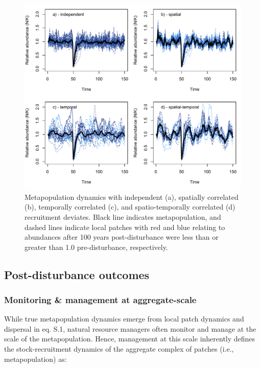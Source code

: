 \documentclass[
]{article}
\begin{document}
\begin{figure}[H]

{\centering \includegraphics{Managing_for_ecological_surprises_in_metapopulations_files/figure-latex/independent stochasticity-1} 

}

\caption{Metapopulation dynamics with independent (a), spatially correlated (b), temporally correlated (c), and spatio-temporally correlated (d) recruitment deviates. Black line indicates metapopulation, and dashed lines indicate local patches with red and blue relating to abundances after 100 years post-disturbance were less than or greater than 1.0 pre-disturbance, respectively.}\label{fig:independent stochasticity}
\end{figure}

\hypertarget{post-disturbance-outcomes}{%
\subsection{Post-disturbance outcomes}\label{post-disturbance-outcomes}}

\hypertarget{monitoring-management-at-aggregate-scale}{%
\subsubsection{Monitoring \& management at
aggregate-scale}\label{monitoring-management-at-aggregate-scale}}

While true metapopulation dynamics emerge from local patch dynamics and
dispersal in eq. S.1, natural resource managers often monitor and manage
at the scale of the metapopulation. Hence, management at this scale
inherently defines the stock-recruitment dynamics of the aggregate
complex of patches (i.e., metapopulation) as:
\end{document}
